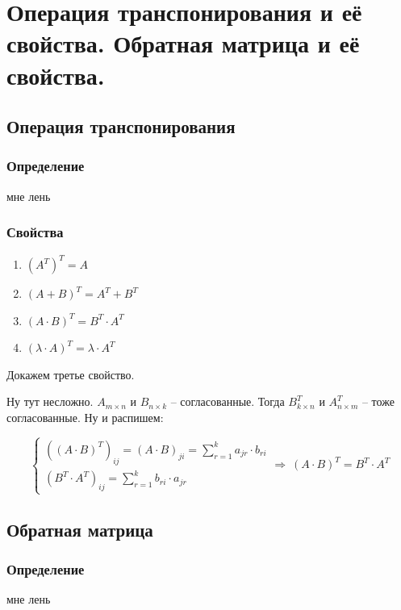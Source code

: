 \documentclass{article}
\begin{document}
\section{Операция транспонирования и её свойства. Обратная матрица и её свойства.}
\subsection{Операция транспонирования}
\subsubsection{Определение}
мне лень
\subsubsection{Свойства}
\begin{enumerate}
    \item $(A^T)^T=A$
    \item $(A+B)^T=A^T+B^T$
    \item $(A\cdot B)^T=B^T\cdot A^T$
    \item $(\lambda\cdot A)^T=\lambda\cdot A^T$
\end{enumerate}
Докажем третье свойство.

Ну тут несложно. $A_{m\times n}$ и $B_{n\times k}$ -- согласованные. Тогда $B^T_{k\times n}$ и $A^T_{n\times m}$ -- тоже согласованные. Ну и распишем:

$$ \begin{cases} ((A\cdot B)^T)_{ij}=(A\cdot B)_{ji}=\sum\limits_{r=1}^k a_{jr}\cdot b_{ri} \\ (B^T\cdot A^T)_{ij} = \sum\limits_{r=1}^k b_{ri}\cdot a_{jr} \end{cases} \Rightarrow\: (A\cdot B)^T = B^T\cdot A^T $$

\subsection{Обратная матрица}
\subsubsection{Определение}
мне лень
\end{document}
